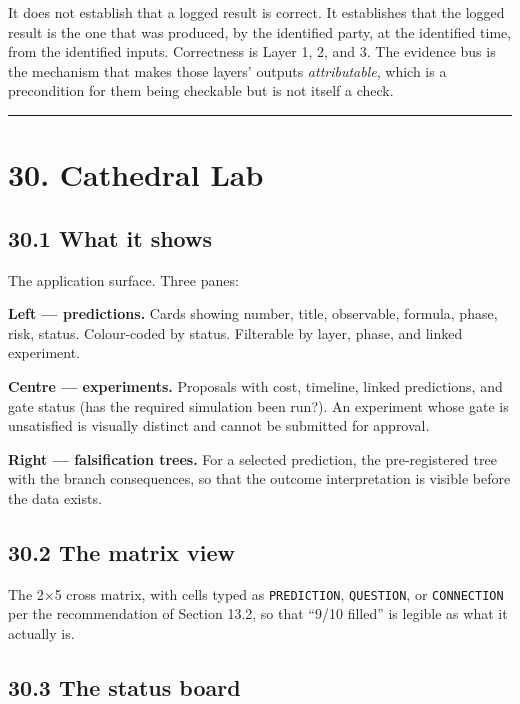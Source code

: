 \documentclass[
  11pt]{report}
\begin{document}
It does not establish that a logged result is correct. It establishes
that the logged result is the one that was produced, by the identified
party, at the identified time, from the identified inputs. Correctness
is Layer 1, 2, and 3. The evidence bus is the mechanism that makes those
layers' outputs \emph{attributable}, which is a precondition for them
being checkable but is not itself a check.

\begin{center}\rule{0.5\linewidth}{0.5pt}\end{center}

\hypertarget{cathedral-lab}{%
\chapter{30. Cathedral Lab}\label{cathedral-lab}}

\hypertarget{what-it-shows}{%
\section{30.1 What it shows}\label{what-it-shows}}

The application surface. Three panes:

\textbf{Left --- predictions.} Cards showing number, title, observable,
formula, phase, risk, status. Colour-coded by status. Filterable by
layer, phase, and linked experiment.

\textbf{Centre --- experiments.} Proposals with cost, timeline, linked
predictions, and gate status (has the required simulation been run?). An
experiment whose gate is unsatisfied is visually distinct and cannot be
submitted for approval.

\textbf{Right --- falsification trees.} For a selected prediction, the
pre-registered tree with the branch consequences, so that the outcome
interpretation is visible before the data exists.

\hypertarget{the-matrix-view}{%
\section{30.2 The matrix view}\label{the-matrix-view}}

The 2×5 cross matrix, with cells typed as \texttt{PREDICTION},
\texttt{QUESTION}, or \texttt{CONNECTION} per the recommendation of
Section 13.2, so that ``9/10 filled'' is legible as what it actually is.

\hypertarget{the-status-board}{%
\section{30.3 The status board}\label{the-status-board}}
\end{document}

